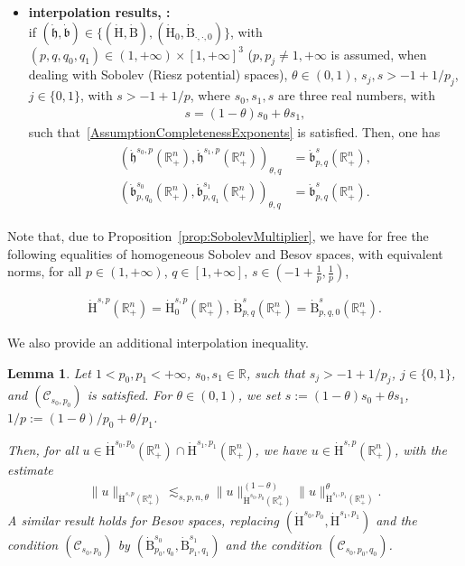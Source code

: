 \documentclass[10pt]{amsart}
\newtheorem{lemm}[theo]{Lemma}\newtheorem{prop}[theo]{Proposition}\newtheorem{coro}[theo]{Corollary}\newtheorem{conj}[theo]{Conjecture}
\theoremstyle{definition}\newtheorem{defi}[theo]{Definition}\newtheorem{rema}[theo]{Remark}\newtheorem{exam}[theo]{Example}\newtheorem{exem}[theo]{Example}\newtheorem{nota}[theo]{Notation}
\newcommand{\bbR}{\mathbb{R}}
\newcommand{\rmH}{\mathrm{H}}%
\newcommand{\rmB}{\mathrm{B}}
\newcommand{\clC}{\mathcal{C}}
\newcommand{\fkh}{\mathfrak{h}}
\newcommand{\fkb}{\mathfrak{b}}
\begin{document}
\begin{itemize}
\item \textbf{interpolation results, \cite[Propositions~3.17~\&~3.22]{Gaudin2022}:} \\
if $(\dot{\fkh},\dot{\fkb})\in\{(\dot{\rmH},\dot{\rmB}), (\dot{\rmH}_0,\dot{\rmB}_{\cdot,\cdot,0})\}$, with $(p,q,q_0,q_1)\in(1,+\infty)\times[1,+\infty]^3$ ($p,p_j\neq 1,+\infty$ is assumed, when dealing with Sobolev (Riesz potential) spaces), $\theta\in(0,1)$, $s_j,s>-1+1/p_j$, $j\in\{0,1\}$, with $s>-1+1/p$, where $s_0,s_1,s$ are three real numbers, with
\begin{align*}
s= (1-\theta)s_0+ \theta s_1,
\end{align*}
such that~\eqref{AssumptionCompletenessExponents} is satisfied. Then, one has
\begin{align}
\begin{split}
\left(\dot{\fkh}^{s_0,p}\left(\bbR^n_+\right),\dot{\fkh}^{s_1,p}\left(\bbR^n_+\right)\right)_{\theta,q}&= \dot{\fkb}^{s}_{p,q}\left(\bbR^n_+\right), \\
 \left(\dot{\fkb}^{s_0}_{p,q_0}\left(\bbR^n_+\right),\dot{\fkb}^{s_1}_{p,q_1}\left(\bbR^n_+\right)\right)_{\theta,q} &= \dot{\fkb}^{s}_{p,q}\left(\bbR^n_+\right).
\end{split}
\end{align}
\end{itemize}

Note that, due to Proposition~\ref{prop:SobolevMultiplier}, we have for free the following equalities of homogeneous Sobolev and Besov spaces, with equivalent norms, for all $p\in(1,+\infty)$, $q\in[1,+\infty]$, $s\in(-1+\frac{1}{p},\frac{1}{p})$,

\begin{align}
\dot{\rmH}^{s,p}\left(\bbR^n_+\right) = \dot{\rmH}^{s,p}_0\left(\bbR^n_+\right), \, \dot{\rmB}^{s}_{p,q}\left(\bbR^n_+\right)=\dot{\rmB}^{s}_{p,q,0}\left(\bbR^n_+\right) .
\end{align}

We also provide an additional interpolation inequality.

\begin{lemm}\label{lem:interpIneqRn+}
Let $1<p_0,p_1<+\infty$, $s_0,s_1\in\bbR$, such that $s_j>-1+1/p_j$, $j\in\{0,1\}$, and $(\clC_{s_0,p_0})$ is satisfied. For $\theta\in(0,1)$, we set $s:=(1-\theta)s_0+\theta s_1$, $1/p:=(1-\theta)/p_0+\theta/p_1$.

Then, for all $u\in \dot{\rmH}^{s_0,p_0}(\bbR^n_+)\cap\dot{\rmH}^{s_1,p_1}(\bbR^n_+)$, we have $u\in \dot{\rmH}^{s,p}(\bbR^n_+)$, with the estimate
\begin{align*}
\| u \|_{\dot{\rmH}^{s,p}\left(\bbR^n_+\right)} \lesssim_{s,p,n,\theta} \| u \|_{\dot{\rmH}^{s_0,p_0}\left(\bbR^n_+\right)}^{(1-\theta)}\| u \|_{\dot{\rmH}^{s_1,p_1}\left(\bbR^n_+\right)}^{\theta}.
\end{align*}
A similar result holds for Besov spaces, replacing $(\dot{\rmH}^{s_0,p_0},\dot{\rmH}^{s_1,p_1})$ and the condition $(\clC_{s_0,p_0})$ by $(\dot{\rmB}^{s_0}_{p_0,q_0},\dot{\rmB}^{s_1}_{p_1,q_1})$ and the condition $(\clC_{s_0,p_0,q_0})$.
\end{lemm}
\end{document}
